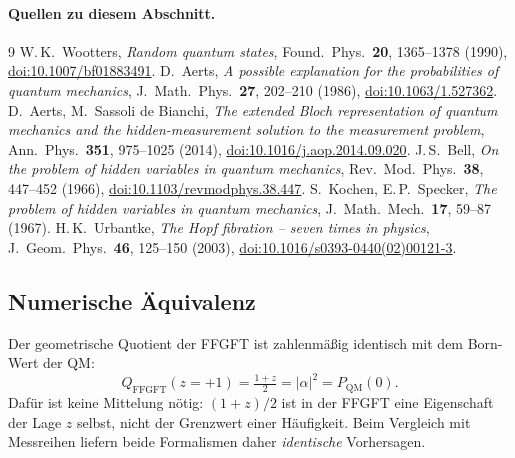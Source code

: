 \paragraph{Quellen zu diesem Abschnitt.}
\begingroup\renewcommand{\chapter}[2]{}\small\raggedright
\begin{thebibliography}{9}
 W.\,K.~Wootters, \emph{Random quantum states},
  Found.\ Phys.\ \textbf{20}, 1365--1378 (1990),
  \href{https://doi.org/10.1007/bf01883491}{doi:10.1007/bf01883491}.
 D.~Aerts, \emph{A possible explanation for the
  probabilities of quantum mechanics}, J.\ Math.\ Phys.\ \textbf{27},
  202--210 (1986),
  \href{https://doi.org/10.1063/1.527362}{doi:10.1063/1.527362}.
 D.~Aerts, M.~Sassoli de Bianchi, \emph{The
  extended Bloch representation of quantum mechanics and the
  hidden-measurement solution to the measurement problem}, Ann.\ Phys.\
  \textbf{351}, 975--1025 (2014),
  \href{https://doi.org/10.1016/j.aop.2014.09.020}{doi:10.1016/j.aop.2014.09.020}.
\bibitem{bell1966} J.\,S.~Bell, \emph{On the problem of hidden
  variables in quantum mechanics}, Rev.\ Mod.\ Phys.\ \textbf{38},
  447--452 (1966),
  \href{https://doi.org/10.1103/revmodphys.38.447}{doi:10.1103/revmodphys.38.447}.
\bibitem{kochen1967} S.~Kochen, E.\,P.~Specker, \emph{The problem of
  hidden variables in quantum mechanics}, J.\ Math.\ Mech.\ \textbf{17},
  59--87 (1967).
 H.\,K.~Urbantke, \emph{The Hopf fibration --
  seven times in physics}, J.\ Geom.\ Phys.\ \textbf{46}, 125--150
  (2003),
  \href{https://doi.org/10.1016/s0393-0440(02)00121-3}{doi:10.1016/s0393-0440(02)00121-3}.
\end{thebibliography}\endgroup

\subsection{Numerische Äquivalenz}

Der geometrische Quotient der FFGFT ist zahlenmäßig identisch mit
dem Born-Wert der QM:
\begin{equation}
  Q_\text{FFGFT}(z = +1) = \tfrac{1+z}{2} = |\alpha|^2 = P_\text{QM}(0).
\end{equation}
Dafür ist keine Mittelung nötig: $(1+z)/2$ ist in der FFGFT eine
Eigenschaft der Lage $z$ selbst, nicht der Grenzwert einer
Häufigkeit. Beim Vergleich mit Messreihen liefern beide Formalismen
daher \emph{identische} Vorhersagen.

